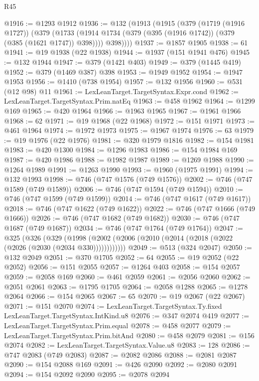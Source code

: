 \begin{lexlean}{R45}
\begin{coremodule}
@1916 := @1293 @1912
@1936 := @132
    (@1913
      (@1915
        (@379
          (@1719 (@1916 @1727))
          (@379
            (@1733 (@1914 @1734 (@379 (@395 (@1916 @1742)) (@379 (@385 (@1621 @1747)) @398))))
            @398))))
@1937 := @1857 @1905
@1938 := 61
@1941 := @19 @1938 (@22 @1938)
@1944 := @1937 (@151 @1941 @476)
@1945 := @132 @1944
@1947 := @379 (@1421 @403)
@1949 := @379 (@1445 @419)
@1952 := @379 (@1469 @387) @398
@1953 := @1949 @1952
@1954 := @1947 @1953
@1956 := @1410 (@738 @1954)
@1957 := @132 @1956
@1960 := @531 (@12 @98) @11
@1961 := LexLeanTarget.TargetSyntax.Expr.cond
@1962 := LexLeanTarget.TargetSyntax.Prim.natEq
@1963 := @458 @1962
@1964 := @1299 @169
@1965 := @420 @1964
@1966 := @1963 @1965
@1967 := @1961 @1966
@1968 := 62
@1971 := @19 @1968 (@22 @1968)
@1972 := @151 @1971
@1973 := @461 @1964
@1974 := @1972 @1973
@1975 := @1967 @1974
@1976 := 63
@1979 := @19 @1976 (@22 @1976)
@1981 := @320 @1979 @1816
@1982 := @154 @1981
@1983 := @420 @1300
@1984 := @1296 @1983
@1986 := @154 @1984 @169
@1987 := @420 @1986
@1988 := @1982 @1987
@1989 := @1269 @1988
@1990 := @1264 @1989
@1991 := @1263 @1990
@1993 := @1960 (@1975 @1991)
@1994 := @132 @1993
@1998 := @746 (@747 @1576 (@749 @1576))
@2002 := @746 (@747 @1589 (@749 @1589))
@2006 := @746 (@747 @1594 (@749 @1594))
@2010 := @746 (@747 @1599 (@749 @1599))
@2014 := @746 (@747 @1617 (@749 @1617))
@2018 := @746 (@747 @1622 (@749 @1622))
@2022 := @746 (@747 @1666 (@749 @1666))
@2026 := @746 (@747 @1682 (@749 @1682))
@2030 := @746 (@747 @1687 (@749 @1687))
@2034 := @746 (@747 @1764 (@749 @1764))
@2047 := @325
    (@326
      (@329 (@1998 (@2002 (@2006 (@2010 (@2014 (@2018 (@2022 (@2026 (@2030 (@2034 @330))))))))))))
@2049 := @513 (@324 @2047)
@2050 := @132 @2049
@2051 := @370 @1705
@2052 := 64
@2055 := @19 @2052 (@22 @2052)
@2056 := @151 @2055
@2057 := @1264 @403
@2058 := @154 @2057
@2059 := @2058 @169
@2060 := @461 @2059
@2061 := @2056 @2060
@2062 := @2051 @2061
@2063 := @1795 @1705
@2064 := @2058 @1288
@2065 := @1278 @2064
@2066 := @154 @2065
@2067 := 65
@2070 := @19 @2067 (@22 @2067)
@2071 := @151 @2070
@2074 := LexLeanTarget.TargetSyntax.Ty.fixed LexLeanTarget.TargetSyntax.IntKind.u8
@2076 := @347 @2074 @419
@2077 := LexLeanTarget.TargetSyntax.Prim.equal
@2078 := @458 @2077
@2079 := LexLeanTarget.TargetSyntax.Prim.bitAnd
@2080 := @458 @2079
@2081 := @156 @2074
@2082 := LexLeanTarget.TargetSyntax.Value.u8
@2083 := 128
@2086 := @747 @2083 (@749 @2083)
@2087 := @2082 @2086
@2088 := @2081 @2087
@2090 := @154 @2088 @169
@2091 := @426 @2090
@2092 := @2080 @2091
@2094 := @154 @2092 @2090
@2095 := @2078 @2094

\end{coremodule}
\end{lexlean}
